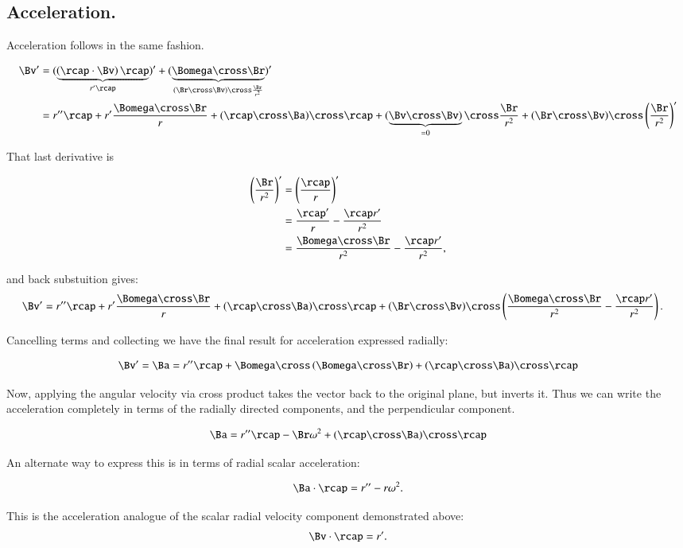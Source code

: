 \documentclass{article}      %
\begin{document}
\subsection{ Acceleration. }

Acceleration follows in the same fashion.

\begin{align*}
\Bv'
&= (
\underbrace{\left(\rcap \cdot \Bv\right) \rcap}_{r'\rcap}
)' + (
\underbrace{\Bomega \cross \Br}_
{(\Br \cross \Bv) \cross \frac{\Br}{r^2}}
)' \\
&= r'' \rcap 
 + r' \frac{\Bomega \cross \Br}{r}
 + (\rcap \cross \Ba) \cross \rcap
 + (\underbrace{\Bv \cross \Bv)}_{=0} \cross \frac{\Br}{r^2}
 + (\Br \cross \Bv) \cross \left(\frac{\Br}{r^2}\right)'
\end{align*}

That last derivative is

\begin{align*}
\left(\frac{\Br}{r^2}\right)' 
&= \left(\frac{\rcap}{r}\right)' \\
&= \frac{\rcap'}{r} - \frac{\rcap r'}{r^2} \\
&= \frac{\Bomega \cross \Br}{r^2} - \frac{\rcap r'}{r^2},
\end{align*}

and back substuition gives:
\begin{align*}
\Bv'
&= r'' \rcap 
 + r' \frac{\Bomega \cross \Br}{r}
 + (\rcap \cross \Ba) \cross \rcap
 + (\Br \cross \Bv) \cross \left( \frac{\Bomega \cross \Br}{r^2} - \frac{\rcap r'}{r^2} \right).
\end{align*}

Cancelling terms and collecting we have the final result for acceleration expressed radially:

\begin{equation}
\Bv' = \Ba = r'' \rcap + \Bomega \cross \left( {\Bomega \cross \Br} \right) + (\rcap \cross \Ba) \cross \rcap
\end{equation}

Now, applying the angular velocity via cross product takes the vector back to the original plane, but inverts it.  Thus we can write the acceleration completely in terms of the radially directed components, and the perpendicular component.

\begin{equation}
\Ba = r'' \rcap -\Br \omega^2 + (\rcap \cross \Ba) \cross \rcap
\end{equation}

An alternate way to express this is in terms of radial scalar acceleration:

\begin{equation}
\Ba \cdot \rcap = r'' - r\omega^2.
\end{equation}

This is the acceleration analogue of the scalar radial velocity component demonstrated above:
\begin{equation}
\Bv \cdot \rcap = r'.
\end{equation}
\end{document}
